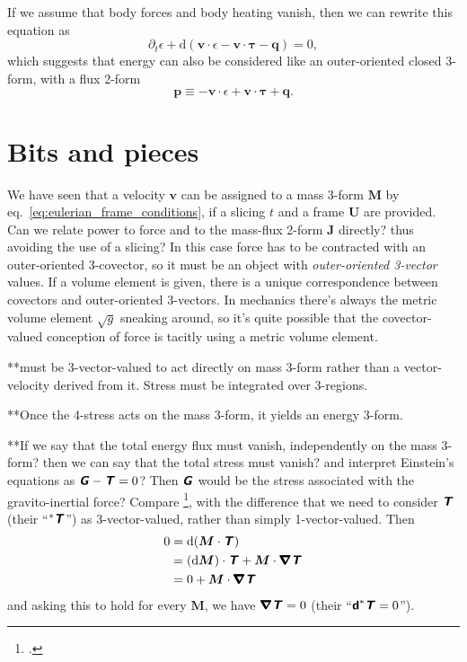\documentclass[\ifafour a4paper,12pt,\else a5paper,10pt,\fi%
onecolumn,oneside,article,%
british%
]{memoir}
\theoremstyle{remark}
\theoremstyle{innote}
\newcommand*{\mathte}[1]{\textbf{\textit{\textsf{#1}}}}
\newcommand*{\citep}{\footcites}
\newcommand*{\de}{\partialup}%
\newcommand*{\di}{\mathrm{d}}%
\renewcommand*{\|}[1][]{\nonscript\,#1\vert\nonscript\;\mathopen{}}
\newcommand*{\chap}{ch.}%
\newcommand*{\eqn}{eq.}%
\newcommand*{\yrr}{M}
\newcommand*{\yr}{\bm{\yrr}}
\newcommand*{\yjj}{J}
\newcommand*{\yj}{\bm{\yjj}}
\newcommand*{\yqq}{q}
\newcommand*{\yq}{\bm{\yqq}}
\newcommand*{\yGG}{G}
\newcommand*{\yG}{\mathte{\yGG}}
\newcommand*{\yTT}{\tau}
\newcommand*{\yT}{\bm{\yTT}}
\newcommand*{\yTTf}{T}
\newcommand*{\yTf}{\mathte{\yTTf}}
\newcommand*{\yvvt}{v}
\newcommand*{\yvt}{\bm{\yvvt}}
\newcommand*{\yFF}{U}
\newcommand*{\yF}{\bm{\yFF}}
\newcommand*{\ygg}{g}
\newcommand*{\ygv}{\sqrt{\ygg}}
\newcommand*{\ypp}{p}
\newcommand*{\yp}{\bm{\ypp}}
\newcommand*{\ye}{\epsilon}
\newcommand*{\yDi}{\pmb{\bm{\nabla}}}
\begin{document}
If we assume that body forces and body heating vanish, then we can rewrite
this equation as
\begin{equation}
  \label{eq:balance_energy_suggests_3form}
  \de_t\ye + \di(\yvt \cdot \ye -\yvt\cdot\yT - \yq) = 0,
\end{equation}
which suggests that energy can also be considered like an outer-oriented
closed 3-form, with a flux 2-form
\begin{equation}
  \label{eq:energy_4velocity}
  \yp \equiv -\yvt \cdot\ye + \yvt\cdot\yT +\yq.
\end{equation}





\section{Bits and pieces}
\label{sec:bits}




We have seen that a velocity $\yvt$ can be
assigned to a mass 3-form $\yr$ by
\eqn~\eqref{eq:eulerian_frame_conditions}, if a slicing $t$ and a frame
$\yF$ are provided. Can we relate power to force and to the mass-flux
2-form $\yj$ directly? thus avoiding the use of a slicing? In this case
force has to be contracted with an outer-oriented 3-covector, so it must be
an object with \emph{outer-oriented 3-vector} values. If a volume element
is given, there is a unique correspondence between covectors and
outer-oriented 3-vectors. In mechanics there's always the metric volume
element $\ygv$ sneaking around, so it's quite possible that the
covector-valued conception of force is tacitly using a metric volume
element.


**must be 3-vector-valued to act directly on mass 3-form rather than a
vector-velocity derived from it. Stress must be integrated over 3-regions.

**Once the 4-stress acts on the mass 3-form, it yields an energy 3-form.

**If we say that the total energy flux must vanish, independently on the
mass 3-form? then we can say that the total stress must vanish? and
interpret Einstein's equations as $\yG-\yTf = 0$? Then $\yG$ would be the
stress associated with the gravito-inertial force? Compare
\citep[\chap~15]{misneretal1970_r1973}, with the difference that we need to
consider $\yTf$ (their \enquote{$^*\yTf$}) as
3-vector-valued, rather than simply 1-vector-valued. Then
\begin{equation}
  \label{eq:why_4stress_zero}
  \begin{split}
    0 &=   \di(\yr \cdot \yTf) \\
    &= (\di\yr)\cdot\yTf + \yr \cdot \yDi\yTf \\
    &= 0 + \yr \cdot \yDi\yTf
  \end{split}
\end{equation}
and asking this to hold for every $\yr$, we have $\yDi\yTf = 0$ (their
\enquote{$\bm{\mathsf{d}}^*\yTf=0$}).
\end{document}
